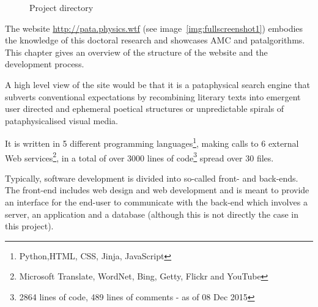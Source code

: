 \begin{figure}
  \centering
  \caption[Project directory]{Project directory}
  \label{fig:dir}
  \vspace{-2cm}
\end{figure}

The website \url{http://pata.physics.wtf} (see image~\ref{img:fullscreenshot1}) embodies the knowledge of this doctoral research and showcases \ac{AMC} and patalgorithms. This chapter gives an overview of the structure of the website and the development process.

A high level view of the site would be that it is a pataphysical search engine that subverts conventional expectations by recombining literary texts into emergent user directed and ephemeral poetical structures or unpredictable spirals of pataphysicalised visual media. 

It is written in \num{5} different programming languages\footnote{Python,\ac{HTML}, CSS, Jinja, JavaScript}, making calls to \num{6} external Web services\footnote{Microsoft Translate, WordNet, Bing, Getty, Flickr and YouTube}, in a total of over \num{3000} lines of code\footnote{\num{2864} lines of code, \num{489} lines of comments - as of 08 Dec 2015} spread over \num{30} files. 

Typically, software development is divided into so-called front- and back-ends. The front-end includes web design and web development and is meant to provide an interface for the end-user to communicate with the back-end which involves a server, an application and a database (although this is not directly the case in this project).

